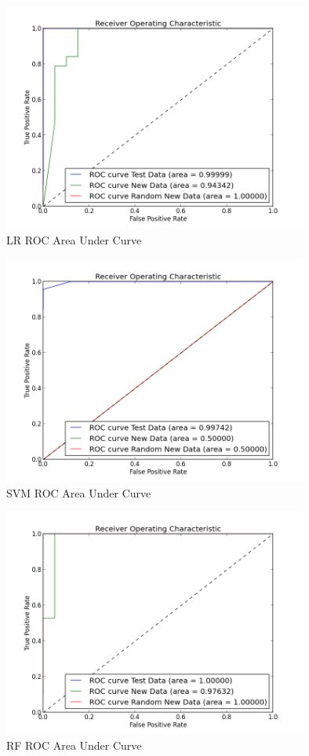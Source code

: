 \begin{figure}[!h]
 \centering
\includegraphics[width=10cm]{LRROCAUC}
  \caption[Logistic Regression AUC]
   {LR ROC Area Under Curve}
\end{figure}

\begin{figure}[!h]
 \centering
\includegraphics[width=10cm]{SVMROCAUC}
  \caption[Support Vector Machine AUC]
   {SVM ROC Area Under Curve}
\end{figure}

\begin{figure}[!h]
 \centering
\includegraphics[width=10cm]{RFROCAUC}
  \caption[Random Forests AUC]
   {RF ROC Area Under Curve}
\end{figure}\leavevmode 

